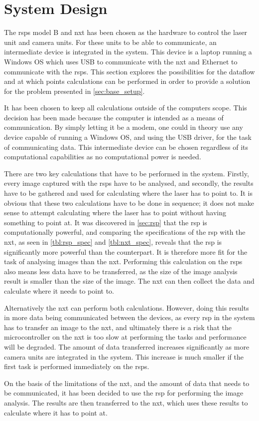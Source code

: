 \section{System Design}
\label{sec:system_design}
The \glspl{rsp} model B and \gls{nxt} has been chosen as the hardware to control the laser unit and camera units. For these units to be able to communicate, an intermediate device is integrated in the system. This device is a laptop running a Windows OS which uses USB to communicate with the \gls{nxt} and Ethernet to communicate with the \glspl{rsp}. This section explores the possibilities for the dataflow and at which points calculations can be performed in order to provide a solution for the problem presented in \cref{sec:base_setup}.

It has been chosen to keep all calculations outside of the computers scope. This decision has been made because the computer is intended as a means of communication. By simply letting it be a modem, one could in theory use any device capable of running a Windows OS, and using the USB driver, for the task of communicating data. This intermediate device can be chosen regardless of its computational capabilities as no computational power is needed.

There are two key calculations that have to be performed in the system. Firstly, every image captured with the \glspl{rsp} have to be analysed, and secondly, the results have to be gathered and used for calculating where the laser has to point to. It is obvious that these two calculations have to be done in sequence; it does not make sense to attempt calculating where the laser has to point without having something to point at. It was discovered in \cref{sec:rsp} that the \gls{rsp} is computationally powerful, and comparing the specifications of the \gls{rsp} with the \gls{nxt}, as seen in \cref{tbl:rsp_spec} and \cref{tbl:nxt_spec}, reveals that the \gls{rsp} is significantly more powerful than the counterpart. It is therefore more fit for the task of analysing images than the \gls{nxt}. Performing this calculation on the \glspl{rsp} also means less data have to be transferred, as the size of the image analysis result is smaller than the size of the image. The \gls{nxt} can then collect the data and calculate where it needs to point to.

Alternatively the \gls{nxt} can perform both calculations. However, doing this results in more data being communicated between the devices, as every \gls{rsp} in the system has to transfer an image to the \gls{nxt}, and ultimately there is a risk that the microcontroller on the \gls{nxt} is too slow at performing the tasks and performance will be degraded. The amount of data transferred increases significantly as more camera units are integrated in the system. This increase is much smaller if the first task is performed immediately on the \glspl{rsp}.

On the basis of the limitations of the \gls{nxt}, and the amount of data that needs to be communicated, it has been decided to use the \gls{rsp} for performing the image analysis. The results are then transferred to the \gls{nxt}, which uses these results to calculate where it has to point at.
